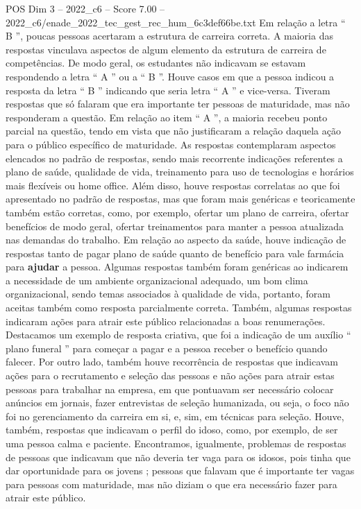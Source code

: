 \begin{textsample}{POS Dim 3 – 2022\_c6 – Score 7.00 – 2022\_c6/enade\_2022\_tec\_gest\_rec\_hum\_6c3def66be.txt}
Em relação a letra “ B ”, poucas pessoas acertaram a estrutura de carreira correta.
A maioria das respostas vinculava aspectos de algum elemento da estrutura de carreira de competências.
De modo geral, os estudantes não indicavam se estavam respondendo a letra “ A ” ou a “ B ”.
Houve casos em que a pessoa indicou a resposta da letra “ B ” indicando que seria letra “ A ” e vice-versa.
Tiveram respostas que só falaram que era importante ter pessoas de maturidade, mas não responderam a questão.
Em relação ao item “ A ”, a maioria recebeu ponto parcial na questão, tendo em vista que não justificaram a relação daquela ação para o público específico de maturidade.
As respostas contemplaram aspectos elencados no padrão de respostas, sendo mais recorrente indicações referentes a plano de saúde, qualidade de vida, treinamento para uso de tecnologias e horários mais flexíveis ou home office.
Além disso, houve respostas correlatas ao que foi apresentado no padrão de respostas, mas que foram mais genéricas e teoricamente também estão corretas, como, por exemplo, ofertar um plano de carreira, ofertar benefícios de modo geral, ofertar treinamentos para manter a pessoa atualizada nas demandas do trabalho.
Em relação ao aspecto da saúde, houve indicação de respostas tanto de pagar plano de saúde quanto de benefício para vale farmácia para \textbf{ajudar} a pessoa.
Algumas respostas também foram genéricas ao indicarem a necessidade de um ambiente organizacional adequado, um bom clima organizacional, sendo temas associados à qualidade de vida, portanto, foram aceitas também como resposta parcialmente correta.
Também, algumas respostas indicaram ações para atrair este público relacionadas a boas renumerações.
Destacamos um exemplo de resposta criativa, que foi a indicação de um auxílio “ plano funeral ” para começar a pagar e a pessoa receber o benefício quando falecer.
Por outro lado, também houve recorrência de respostas que indicavam ações para o recrutamento e seleção das pessoas e não ações para atrair estas pessoas para trabalhar na empresa, em que pontuavam ser necessário colocar anúncios em jornais, fazer entrevistas de seleção humanizada, ou seja, o foco não foi no gerenciamento da carreira em si, e, sim, em técnicas para seleção.
Houve, também, respostas que indicavam o perfil do idoso, como, por exemplo, de ser uma pessoa calma e paciente.
Encontramos, igualmente, problemas de respostas de pessoas que indicavam que não deveria ter vaga para os idosos, pois tinha que dar oportunidade para os jovens ; pessoas que falavam que é importante ter vagas para pessoas com maturidade, mas não diziam o que era necessário fazer para atrair este público.

\end{textsample}
